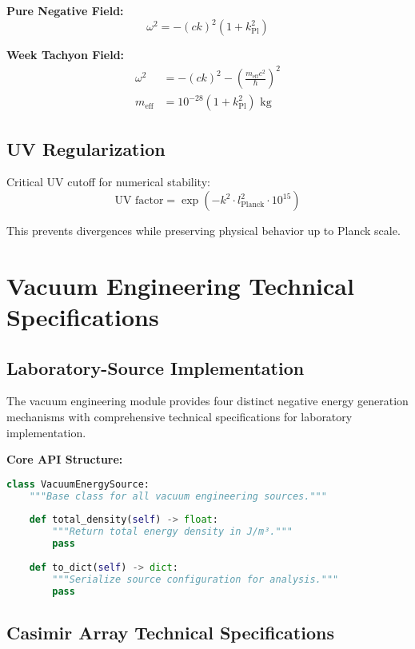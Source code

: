 \documentclass[11pt]{article}
\begin{document}
\textbf{Pure Negative Field:}
\begin{equation}
\omega^2 = -(ck)^2(1 + k_{\text{Pl}}^2)
\end{equation}

\textbf{Week Tachyon Field:}
\begin{align}
\omega^2 &= -(ck)^2 - \left(\frac{m_{\text{eff}}c^2}{\hbar}\right)^2 \\
m_{\text{eff}} &= 10^{-28}(1 + k_{\text{Pl}}^2) \text{ kg}
\end{align}

\subsection{UV Regularization}

Critical UV cutoff for numerical stability:
\begin{equation}
\text{UV factor} = \exp(-k^2 \cdot l_{\text{Planck}}^2 \cdot 10^{15})
\end{equation}

This prevents divergences while preserving physical behavior up to Planck scale.

\section{Vacuum Engineering Technical Specifications}

\subsection{Laboratory-Source Implementation}

The vacuum engineering module provides four distinct negative energy generation mechanisms with comprehensive technical specifications for laboratory implementation.

\textbf{Core API Structure:}
\begin{lstlisting}[language=Python]
class VacuumEnergySource:
    """Base class for all vacuum engineering sources."""
    
    def total_density(self) -> float:
        """Return total energy density in J/m³."""
        pass
    
    def to_dict(self) -> dict:
        """Serialize source configuration for analysis."""
        pass
\end{lstlisting}

\subsection{Casimir Array Technical Specifications}
\end{document}
